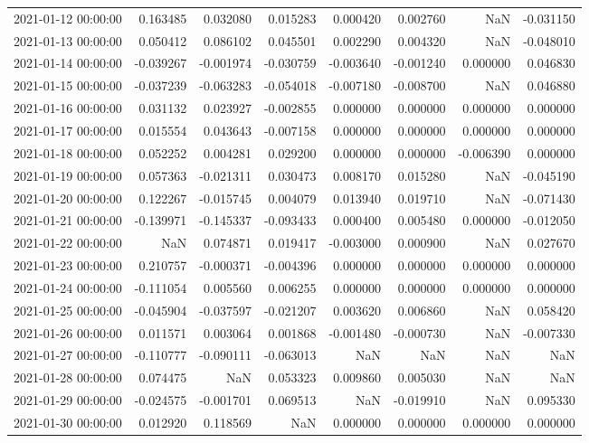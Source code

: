 \begin{tabular}{lrrrrrrr}
2021-01-12 00:00:00 & 0.163485 & 0.032080 & 0.015283 & 0.000420 & 0.002760 & NaN & -0.031150 \\
2021-01-13 00:00:00 & 0.050412 & 0.086102 & 0.045501 & 0.002290 & 0.004320 & NaN & -0.048010 \\
2021-01-14 00:00:00 & -0.039267 & -0.001974 & -0.030759 & -0.003640 & -0.001240 & 0.000000 & 0.046830 \\
2021-01-15 00:00:00 & -0.037239 & -0.063283 & -0.054018 & -0.007180 & -0.008700 & NaN & 0.046880 \\
2021-01-16 00:00:00 & 0.031132 & 0.023927 & -0.002855 & 0.000000 & 0.000000 & 0.000000 & 0.000000 \\
2021-01-17 00:00:00 & 0.015554 & 0.043643 & -0.007158 & 0.000000 & 0.000000 & 0.000000 & 0.000000 \\
2021-01-18 00:00:00 & 0.052252 & 0.004281 & 0.029200 & 0.000000 & 0.000000 & -0.006390 & 0.000000 \\
2021-01-19 00:00:00 & 0.057363 & -0.021311 & 0.030473 & 0.008170 & 0.015280 & NaN & -0.045190 \\
2021-01-20 00:00:00 & 0.122267 & -0.015745 & 0.004079 & 0.013940 & 0.019710 & NaN & -0.071430 \\
2021-01-21 00:00:00 & -0.139971 & -0.145337 & -0.093433 & 0.000400 & 0.005480 & 0.000000 & -0.012050 \\
2021-01-22 00:00:00 & NaN & 0.074871 & 0.019417 & -0.003000 & 0.000900 & NaN & 0.027670 \\
2021-01-23 00:00:00 & 0.210757 & -0.000371 & -0.004396 & 0.000000 & 0.000000 & 0.000000 & 0.000000 \\
2021-01-24 00:00:00 & -0.111054 & 0.005560 & 0.006255 & 0.000000 & 0.000000 & 0.000000 & 0.000000 \\
2021-01-25 00:00:00 & -0.045904 & -0.037597 & -0.021207 & 0.003620 & 0.006860 & NaN & 0.058420 \\
2021-01-26 00:00:00 & 0.011571 & 0.003064 & 0.001868 & -0.001480 & -0.000730 & NaN & -0.007330 \\
2021-01-27 00:00:00 & -0.110777 & -0.090111 & -0.063013 & NaN & NaN & NaN & NaN \\
2021-01-28 00:00:00 & 0.074475 & NaN & 0.053323 & 0.009860 & 0.005030 & NaN & NaN \\
2021-01-29 00:00:00 & -0.024575 & -0.001701 & 0.069513 & NaN & -0.019910 & NaN & 0.095330 \\
2021-01-30 00:00:00 & 0.012920 & 0.118569 & NaN & 0.000000 & 0.000000 & 0.000000 & 0.000000 \\

\end{tabular}
